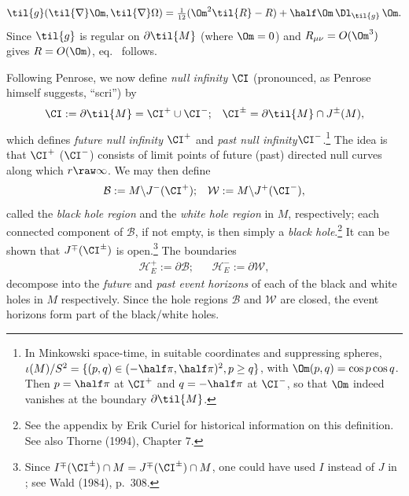 \documentclass[11pt,a4paper]{article}
\newcommand{\n}{\nabla}
\newcommand{\p}{\partial}
\begin{document}
\begin{equation}
\til{g}(\til{\nabla} \Om, \til{\nabla}\Omega)=\mbox{\footnotesize $\frac{1}{12}$}(\Om^2\til{R}-R)+\half \Om\,\Dl_{\til{g}}\,\Om.\label{preeikonal} 
\end{equation}
Since $\til{g}$ is regular on $\p\til{M}$ (where $\Om=0$) and $R_{\mu\nu}=O(\Om^3)$ gives $R=O(\Om)$, eq.\   follows.
 \enp
 
\smallskip 
\noindent Following Penrose, we now define  \emph{null infinity}  $\CI$ (pronounced, as Penrose himself suggests, ``scri'') by
  \begin{align}
\CI:=\p\til{M}=\CI^+\cup\CI^-; && \CI^{\pm}=\p\til{M}\cap J^{\pm}(M),
\end{align}
which defines  \emph{future null infinity} $\CI^+$ and  \emph{past null infinity}$\CI^-$.\footnote{In Minkowski space-time, in suitable coordinates and suppressing spheres, $\iota(M)/S^2=\{(p,q)\in(-\half\pi,\half\pi)^2,p\geq q\}$, with  $\Om(p,q)=\cos p\cos q$. Then $p=\half \pi$ at $\CI^+$ and $q=-\half\pi$ at $\CI^-$,  so that $\Om$ indeed vanishes at the boundary $\p\til{M}$. } The idea is that $\CI^+$ ($\CI^-$) consists of limit points of future (past) directed null curves along which $r\raw\infty$. 
We may then define 
   \begin{align}
  \mathcal{B}:= M\backslash J^-(\CI^+); &&   \mathcal{W}:= M\backslash J^+(\CI^-), \label{BHRWHR}
  \end{align}
  called the \emph{black hole region} and the \emph{white hole region}  in $M$, respectively;
   each connected component of $  \mathcal{B}$, if not empty, is then simply a \emph{black hole}.\footnote{
  See the appendix by Erik Curiel for historical information on this definition.
  See also Thorne (1994), Chapter 7.} It can be shown that $J^{\mp}(\CI^{\pm})$ is open.\footnote{
  Since $I^{\mp}(\CI^{\pm})\cap M=J^{\mp}(\CI^{\pm})\cap M$, one could have used $I$ instead of $J$ in ; see Wald (1984), p.\ 308.}
 The 
boundaries
    \begin{align}
 \mathcal{H}_E^+:=\p \mathcal{B}; &&   \mathcal{H}_E^-:=\p  \mathcal{W}, \label{defEHplus}
  \end{align}
  decompose into the \emph{future} and \emph{past event horizons} of each of the black and white holes in $M$ respectively. 
  Since the hole regions $\mathcal{B}$ and $\mathcal{W}$  are closed, the event horizons form part of  the black/white holes. 
    
\end{document}
